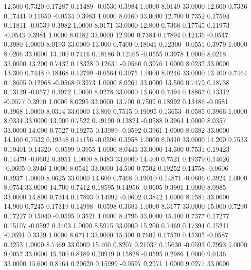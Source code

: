   12.500   0.7320   0.17287   0.11489  -0.0530   0.3984   1.0000   8.0149  33.0000
  12.600   0.7336   0.17441   0.11650  -0.0534   0.3983   1.0000   8.0160  33.0000
  12.700   0.7352   0.17594   0.11811  -0.0539   0.3982   1.0000   8.0171  33.0000
  12.800   0.7368   0.17745   0.11973  -0.0543   0.3981   1.0000   8.0182  33.0000
  12.900   0.7384   0.17894   0.12136  -0.0547   0.3980   1.0000   8.0193  33.0000
  13.000   0.7400   0.18041   0.12300  -0.0551   0.3979   1.0000   8.0206  33.0000
  13.100   0.7416   0.18186   0.12465  -0.0555   0.3978   1.0000   8.0218  33.0000
  13.200   0.7432   0.18328   0.12631  -0.0560   0.3976   1.0000   8.0232  33.0000
  13.300   0.7448   0.18468   0.12799  -0.0564   0.3975   1.0000   8.0246  33.0000
  13.400   0.7464   0.18605   0.12968  -0.0568   0.3973   1.0000   8.0261  33.0000
  13.500   0.7479   0.18738   0.13139  -0.0572   0.3972   1.0000   8.0278  33.0000
  13.600   0.7494   0.18867   0.13312  -0.0577   0.3970   1.0000   8.0295  33.0000
  13.700   0.7509   0.18992   0.13486  -0.0581   0.3968   1.0000   8.0314  33.0000
  13.800   0.7515   0.19095   0.13653  -0.0585   0.3966   1.0000   8.0334  33.0000
  13.900   0.7522   0.19190   0.13821  -0.0588   0.3964   1.0000   8.0357  33.0000
  14.000   0.7527   0.19275   0.13989  -0.0592   0.3961   1.0000   8.0382  33.0000
  14.100   0.7532   0.19348   0.14156  -0.0596   0.3958   1.0000   8.0410  33.0000
  14.200   0.7533   0.19401   0.14320  -0.0599   0.3955   1.0000   8.0443  33.0000
  14.300   0.7531   0.19423   0.14479  -0.0602   0.3951   1.0000   8.0483  33.0000
  14.400   0.7521   0.19379   0.14626  -0.0605   0.3946   1.0000   8.0541  33.0000
  14.500   0.7502   0.19252   0.14758  -0.0606   0.3937   1.0000   8.0625  33.0000
  14.600   0.7468   0.19010   0.14871  -0.0606   0.3924   1.0000   8.0754  33.0000
  14.700   0.7412   0.18595   0.14956  -0.0605   0.3901   1.0000   8.0985  33.0000
  14.800   0.7314   0.17893   0.14992  -0.0602   0.3842   1.0000   8.1581  33.0000
  14.900   0.7245   0.17319   0.14998  -0.0598   0.3683   1.0000   8.3177  33.0000
  15.000   0.7290   0.17227   0.15040  -0.0595   0.3521   1.0000   8.4796  33.0000
  15.100   0.7377   0.17277   0.15107  -0.0592   0.3403   1.0000   8.5975  33.0000
  15.200   0.7469   0.17394   0.15211  -0.0591   0.3329   1.0000   8.6714  33.0000
  15.300   0.7602   0.17570   0.15305  -0.0587   0.3253   1.0000   8.7469  33.0000
  15.400   0.8207   0.21037   0.15630  -0.0593   0.2993   1.0000   9.0057  33.0000
  15.500   0.8189   0.20919   0.15828  -0.0595   0.2986   1.0000   9.0136  33.0000
  15.600   0.8164   0.20620   0.15999  -0.0597   0.2971   1.0000   9.0277  33.0000
